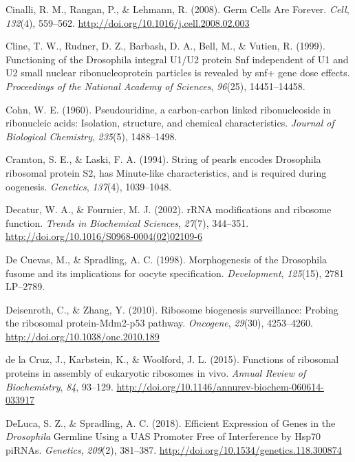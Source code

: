 \documentclass[12pt,twoside]{reedthesis}
\newlength{\cslhangindent}
\newenvironment{cslreferences}%
  {\setlength{\parindent}{0pt}%
  \everypar{\setlength{\hangindent}{\cslhangindent}}\ignorespaces}%
  {\par}
\begin{document}
\begin{cslreferences}
\leavevmode\hypertarget{ref-Cinalli2008d}{}%
Cinalli, R. M., Rangan, P., \& Lehmann, R. (2008). Germ Cells Are Forever. \emph{Cell}, \emph{132}(4), 559--562. \url{http://doi.org/10.1016/j.cell.2008.02.003}

\leavevmode\hypertarget{ref-Cline1999}{}%
Cline, T. W., Rudner, D. Z., Barbash, D. A., Bell, M., \& Vutien, R. (1999). Functioning of the Drosophila integral U1/U2 protein Snf independent of U1 and U2 small nuclear ribonucleoprotein particles is revealed by snf+ gene dose effects. \emph{Proceedings of the National Academy of Sciences}, \emph{96}(25), 14451--14458.

\leavevmode\hypertarget{ref-Cohn1960}{}%
Cohn, W. E. (1960). Pseudouridine, a carbon-carbon linked ribonucleoside in ribonucleic acids: Isolation, structure, and chemical characteristics. \emph{Journal of Biological Chemistry}, \emph{235}(5), 1488--1498.

\leavevmode\hypertarget{ref-Cramton1994a}{}%
Cramton, S. E., \& Laski, F. A. (1994). String of pearls encodes Drosophila ribosomal protein S2, has Minute-like characteristics, and is required during oogenesis. \emph{Genetics}, \emph{137}(4), 1039--1048.

\leavevmode\hypertarget{ref-Decatur2002b}{}%
Decatur, W. A., \& Fournier, M. J. (2002). rRNA modifications and ribosome function. \emph{Trends in Biochemical Sciences}, \emph{27}(7), 344--351. \url{http://doi.org/10.1016/S0968-0004(02)02109-6}

\leavevmode\hypertarget{ref-DeCuevas1998f}{}%
De Cuevas, M., \& Spradling, A. C. (1998). Morphogenesis of the Drosophila fusome and its implications for oocyte specification. \emph{Development}, \emph{125}(15), 2781 LP--2789.

\leavevmode\hypertarget{ref-Deisenroth2010e}{}%
Deisenroth, C., \& Zhang, Y. (2010). Ribosome biogenesis surveillance: Probing the ribosomal protein-Mdm2-p53 pathway. \emph{Oncogene}, \emph{29}(30), 4253--4260. \url{http://doi.org/10.1038/onc.2010.189}

\leavevmode\hypertarget{ref-delacruzFunctionsRibosomalProteins2015}{}%
de la Cruz, J., Karbstein, K., \& Woolford, J. L. (2015). Functions of ribosomal proteins in assembly of eukaryotic ribosomes in vivo. \emph{Annual Review of Biochemistry}, \emph{84}, 93--129. \url{http://doi.org/10.1146/annurev-biochem-060614-033917}

\leavevmode\hypertarget{ref-delucaEfficientExpressionGenes2018}{}%
DeLuca, S. Z., \& Spradling, A. C. (2018). Efficient Expression of Genes in the \emph{Drosophila} Germline Using a UAS Promoter Free of Interference by Hsp70 piRNAs. \emph{Genetics}, \emph{209}(2), 381--387. \url{http://doi.org/10.1534/genetics.118.300874}


\end{cslreferences}
\end{document}
